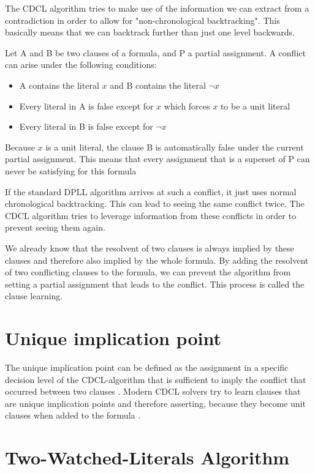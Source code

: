 The CDCL algorithm tries to make use of the information we can extract from a contradiction in order to allow for "non-chronological backtracking". This basically means that we can backtrack further than just one level backwards.

\begin{leftbar}
Let A and B be two clauses of a formula, and P a partial assignment. A conflict can arise under the following conditions:
\begin{itemize}
\item A contains the literal $x$ and B contains the literal $\neg x$
\item Every literal in A is false except for $x$ which forces $x$ to be a unit literal
\item Every literal in B is false except for $\neg x$
\end{itemize}
Because $x$ is a unit literal, the clause B is automatically false under the current partial assignment. This means that every assignment that is a superset of P can never be satisfying for this formula
\end{leftbar}
If the standard DPLL algorithm arrives at such a conflict, it just uses normal chronological backtracking. This can lead to seeing the same conflict twice. The CDCL algorithm tries to leverage information from these conflicts in order to prevent seeing them again.

We already know that the resolvent of two clauses is always implied by these clauses and therefore also implied by the whole formula. By adding the resolvent of two conflicting clauses to the formula, we can prevent the algorithm from setting a partial assignment that leads to the conflict. This process is called the clause learning.

\section{Unique implication point}

The unique implication point can be defined as the assignment in a specific decision level of the CDCL-algorithm that is sufficient to imply the conflict that occurred between two clauses \cite{biere2009handbook}. Modern CDCL solvers try to learn clauses that are unique implication points and therefore asserting, because they become unit clauses when added to the formula \cite{biere2009handbook}.

\section{Two-Watched-Literals Algorithm}
\label{sec:twoWatchedLiterals}

